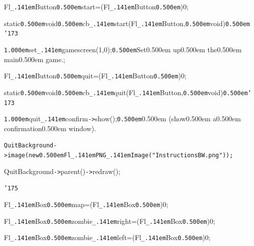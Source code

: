 \documentclass[12pt]{article}
\begin{document}
\noindent
{}\hfill

\noindent
{}Fl{\tt\_\kern.141em}Button{\tt\mc \kern0.500em}{\tt *}start=(Fl{\tt\_\kern.141em}Button{\tt\mc \kern0.500em}{\tt *})0;

\noindent
{}\hfill

\noindent
{}static{\tt\mc \kern0.500em}void{\tt\mc \kern0.500em}cb{\tt\_\kern.141em}start(Fl{\tt\_\kern.141em}Button{\tt *},{\tt\mc \kern0.500em}void{\tt *}){\tt\mc \kern0.500em}{\tt\char'173}

\noindent
{}{\tt\mc \kern1.000em}set{\tt\_\kern.141em}gamescreen(1,0);{\tt\mc \kern0.500em}\rm\mc {\tt /}{\tt /}Set\kern0.500em up\kern0.500em the\kern0.500em main\kern0.500em game.;

\noindent
\tt{}

\noindent
{}\hfill

\noindent
{}Fl{\tt\_\kern.141em}Button{\tt\mc \kern0.500em}{\tt *}quit=(Fl{\tt\_\kern.141em}Button{\tt\mc \kern0.500em}{\tt *})0;

\noindent
{}\hfill

\noindent
{}static{\tt\mc \kern0.500em}void{\tt\mc \kern0.500em}cb{\tt\_\kern.141em}quit(Fl{\tt\_\kern.141em}Button{\tt *},{\tt\mc \kern0.500em}void{\tt *}){\tt\mc \kern0.500em}{\tt\char'173}

\noindent
{}{\tt\mc \kern1.000em}quit{\tt\_\kern.141em}confirm{\tt -}{\tt >}show();{\tt\mc \kern0.500em}\rm\mc {\tt /}{\tt /}\kern0.500em (show\kern0.500em a\kern0.500em confirmation\kern0.500em window).

\noindent
\tt\mc QuitBackground{\tt -}{\tt >}image(new{\tt\mc \kern0.500em}Fl{\tt\_\kern.141em}PNG{\tt\_\kern.141em}Image({\tt "}InstructionsBW.png{\tt "}));

\noindent
{}QuitBackground{\tt -}{\tt >}parent(){\tt -}{\tt >}redraw();

\noindent
{}{\tt\char'175}

\noindent
{}\hfill

\noindent
{}Fl{\tt\_\kern.141em}Box{\tt\mc \kern0.500em}{\tt *}map=(Fl{\tt\_\kern.141em}Box{\tt\mc \kern0.500em}{\tt *})0;

\noindent
{}\hfill

\noindent
{}Fl{\tt\_\kern.141em}Box{\tt\mc \kern0.500em}{\tt *}zombie{\tt\_\kern.141em}right=(Fl{\tt\_\kern.141em}Box{\tt\mc \kern0.500em}{\tt *})0;

\noindent
{}\hfill

\noindent
{}Fl{\tt\_\kern.141em}Box{\tt\mc \kern0.500em}{\tt *}zombie{\tt\_\kern.141em}left=(Fl{\tt\_\kern.141em}Box{\tt\mc \kern0.500em}{\tt *})0;
\end{document}
